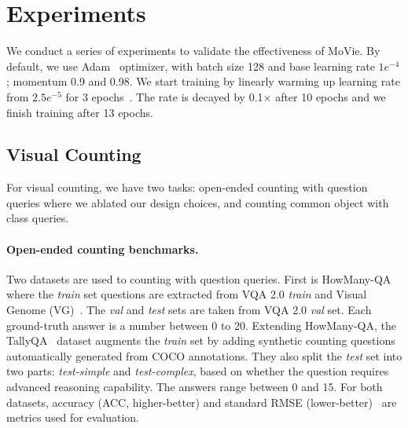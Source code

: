 \documentclass{article} \usepackage[dvipsnames,table]{xcolor}
\newcommand{\ours}[0]{MoVie\xspace}
\def\x{$\times$\xspace}
\begin{document}
\section{Experiments}
We conduct a series of experiments to validate the effectiveness of \ours. By default, we use Adam~\cite{kingma2015adam} optimizer, with batch size 128 and base learning rate $1e^{-4}$; momentum 0.9 and 0.98. We start training by linearly warming up learning rate from $2.5e^{-5}$ for 3 epochs~\cite{yu2019deep}. The rate is decayed by 0.1{\x} after 10 epochs and we finish training after 13 epochs.  

\subsection{Visual Counting\label{sec:exp:count}}

For visual counting, we have two tasks: open-ended counting with question queries where we ablated our design choices, and counting common object with class queries.

\paragraph{Open-ended counting benchmarks.} Two datasets are used to counting with question queries. First is HowMany-QA~\cite{trott2018interpretable} where the {\em train} set questions are extracted from VQA 2.0 {\em train} and Visual Genome (VG)~\cite{krishna2017visual}. The {\em val} and {\em test} sets are taken from VQA 2.0 {\em val} set. Each ground-truth answer is a number between 0 to 20. Extending HowMany-QA, the TallyQA~\cite{acharya2019tallyqa} dataset augments the {\em train} set by adding synthetic counting questions automatically generated from COCO annotations. They also split the \emph{test} set into two parts: \emph{test-simple} and \emph{test-complex}, based on whether the question requires advanced reasoning capability. The answers range between 0 and 15. For both datasets, accuracy (ACC, higher-better) and standard RMSE (lower-better)~\cite{acharya2019tallyqa} are metrics used for evaluation.
\end{document}
